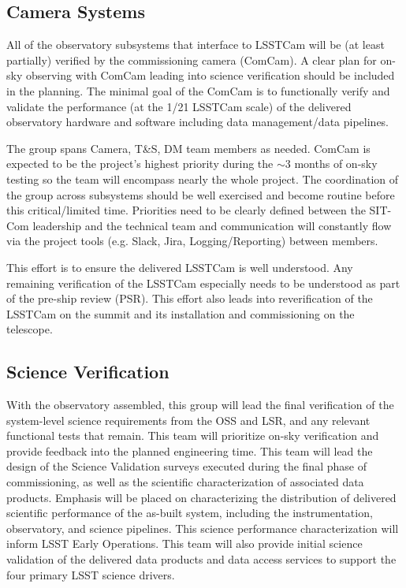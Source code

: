 \documentclass[SE,toc]{lsstdoc}
\begin{document}
\subsection{Camera Systems}
All of the observatory subsystems that interface to LSSTCam will be (at least partially) verified by the commissioning camera (ComCam).
A clear plan for on-sky observing with ComCam leading into science verification should be included in the planning.
The minimal goal of the ComCam is to functionally verify and validate the performance (at the 1/21 LSSTCam scale) of the delivered observatory hardware and software including data management/data pipelines.

The group spans Camera, T\&S, DM team members as needed.
ComCam is expected to be the project’s highest priority during the $\sim$3 months of on-sky testing so the team will encompass nearly the whole project.
The coordination of the group across subsystems should be well exercised and become routine before this critical/limited time.
Priorities need to be clearly defined between the SIT-Com leadership and the technical team and communication will constantly flow via the project tools (e.g. Slack, Jira, Logging/Reporting) between members.

This effort is to ensure the delivered LSSTCam is well understood.
Any remaining verification of the LSSTCam especially needs to be understood as part of the pre-ship review (PSR).
This effort also leads into reverification of the LSSTCam on the summit and its installation and commissioning on the telescope.

\subsection{Science Verification}
With the observatory assembled, this group will lead the final verification of the system-level science requirements from the OSS and LSR, and any relevant functional tests that remain.
This team will prioritize on-sky verification and provide feedback into the planned engineering time.
This team will lead the design of the Science Validation surveys executed during the final phase of commissioning, as well as the scientific characterization of associated data products.
Emphasis will be placed on characterizing the distribution of delivered scientific performance of the as-built system, including the instrumentation, observatory, and science pipelines.
This science performance characterization will inform LSST Early Operations.
This team will also provide initial science validation of the delivered data products and data access services to support the four primary LSST science drivers.
\end{document}
